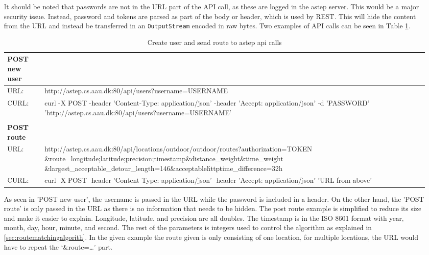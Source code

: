 It should be noted that passwords are not in the URL part of the API call, as these are logged in the \gls{astep} server. 
This would be a major security issue.
Instead, password and tokens are parsed as part of the body or header, which is used by REST. 
This will hide the content from the URL and instead be transferred in an \texttt{OutputStream} encoded in raw bytes. 
Two examples of API calls can be seen in Table \ref{tab:apitable}.

\begin{table}[h]
	\scriptsize
	\centering
	\begin{tabularx}{\textwidth}{l X}
		\textbf{POST new user} &  \\\toprule
		URL:          & http://astep.cs.aau.dk:80/api/users?username=USERNAME  \\
		\rowcolor{blue!10}
		CURL:         & curl -X POST -\-header 'Content-Type: application/json' -\-header 'Accept: application/json' -d 'PASSWORD' 'http://astep.cs.aau.dk:80/api/users?username=USERNAME' \\\\
		\textbf{POST route} & \\\toprule
		URL:          & http://astep.cs.aau.dk:80/api/locations/outdoor/outdoor/routes?authorization=TOKEN
						\&route=longitude;latitude;precision;timestamp\&distance\_weight\&time\_weight
						\&largest\_acceptable\_detour\_length=146\&acceptable\'httptime\_difference=32h\\ 
		\rowcolor{blue!10}
		CURL:         & curl -X POST -\-header 'Content-Type: application/json' -\-header 'Accept: application/json' 'URL from above' \\
	\end{tabularx}
	\caption{Create user and send route to \gls{astep} api calls}
	\label{tab:apitable}
\end{table}


As seen in 'POST new user', the username is passed in the URL while the password is included in a header.
On the other hand, the 'POST route' is only passed in the URL as there is no information that needs to be hidden.
The post route example is simplified to reduce its size and make it easier to explain.
Longitude, latitude, and precision are all doubles.
The timestamp is in the ISO 8601 format with year, month, day, hour, minute, and second.  
The rest of the parameters is integers used to control the algorithm as explained in \ref{sec:routematchingalgorith}. 
In the given example the route given is only consisting of one location, for multiple locations, the URL would have to repeat the \enquote*{\&route=\dots} part.

